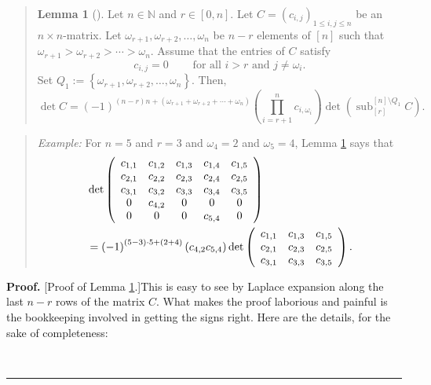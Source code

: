 \documentclass[numbers=enddot,12pt,final,onecolumn,notitlepage]{scrartcl}%
\newenvironment{statement}{\begin{quote}}{\end{quote}}
\theoremstyle{definition}
\newtheorem{lem}[theo]{Lemma}
\newenvironment{lemmain}[1][]
{\begin{statement}\begin{lem}[#1]}
{\end{lem}\end{statement}}
\newenvironment{proof}[1][Proof]{\noindent\textbf{#1.} }{\ \rule{0.5em}{0.5em}}
\newenvironment{lemmain}[1][Proof]{\noindent\textbf{#1.} }{\ \rule{0.5em}{0.5em}}
\let\prodnonlimits\prod
\renewcommand{\prod}{\prodnonlimits\limits}
\begin{document}
\begin{enumerate}
\begin{lemmain}
\label{lem.p37.det2}Let $n\in\mathbb{N}$ and $r\in\left[  0,n\right]  $. Let
$C=\left(  c_{i,j}\right)  _{1\leq i,j\leq n}$ be an $n\times n$-matrix. Let
$\omega_{r+1},\omega_{r+2},\ldots,\omega_{n}$ be $n-r$ elements of $\left[
n\right]  $ such that $\omega_{r+1}>\omega_{r+2}>\cdots>\omega_{n}$. Assume
that the entries of $C$ satisfy%
\begin{equation}
c_{i,j}=0\ \ \ \ \ \ \ \ \ \ \text{for all }i>r\text{ and }j\neq\omega_{i}.
\label{eq.lem.p37.det2.ass}%
\end{equation}
Set $Q_{1}:=\left\{  \omega_{r+1},\omega_{r+2},\ldots,\omega_{n}\right\}  $.
Then,%
\[
\det C=\left(  -1\right)  ^{\left(  n-r\right)  n+\left(  \omega_{r+1}%
+\omega_{r+2}+\cdots+\omega_{n}\right)  }\left(  \prod_{i=r+1}^{n}%
c_{i,\omega_{i}}\right)  \det\left(  \operatorname*{sub}\nolimits_{\left[
r\right]  }^{\left[  n\right]  \setminus Q_{1}}C\right)  .
\]

\end{lemmain}

\begin{statement}
\textit{Example:} For $n=5$ and $r=3$ and $\omega_{4}=2$ and $\omega_{5}=4$,
Lemma \ref{lem.p37.det2} says that%
\begin{align*}
&  \det\left(
\begin{array}
[c]{ccccc}%
c_{1,1} & c_{1,2} & c_{1,3} & c_{1,4} & c_{1,5}\\
c_{2,1} & c_{2,2} & c_{2,3} & c_{2,4} & c_{2,5}\\
c_{3,1} & c_{3,2} & c_{3,3} & c_{3,4} & c_{3,5}\\
0 & c_{4,2} & 0 & 0 & 0\\
0 & 0 & 0 & c_{5,4} & 0
\end{array}
\right) \\
&  =\left(  -1\right)  ^{\left(  5-3\right)  \cdot5+\left(  2+4\right)
}\left(  c_{4,2}c_{5,4}\right)  \det\left(
\begin{array}
[c]{ccc}%
c_{1,1} & c_{1,3} & c_{1,5}\\
c_{2,1} & c_{2,3} & c_{2,5}\\
c_{3,1} & c_{3,3} & c_{3,5}%
\end{array}
\right)  .
\end{align*}

\end{statement}

\begin{proof}
[Proof of Lemma \ref{lem.p37.det2}.]This is easy to see by Laplace expansion
along the last $n-r$ rows of the matrix $C$. What makes the proof laborious
and painful is the bookkeeping involved in getting the signs right. Here are
the details, for the sake of completeness:


\end{proof}
\end{enumerate}
\end{document}
